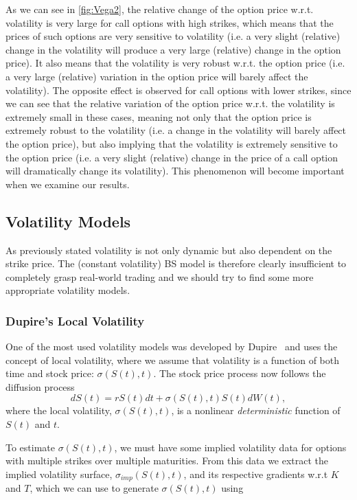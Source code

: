 As we can see in \autoref{fig:Vega2}, the relative change of the option price w.r.t. volatility is very large for call options with high strikes, which means that the prices of such options are very sensitive to volatility (i.e. a very slight (relative) change in the volatility will produce a very large (relative) change in the option price). It also means that the volatility is very robust w.r.t. the option price (i.e. a very large (relative) variation in the option price will barely affect the volatility).
The opposite effect is observed for call options with lower strikes, since we can see that the relative variation of the option price w.r.t. the volatility is extremely small in these cases, meaning not only that the option price is extremely robust to the volatility (i.e. a change in the volatility will barely affect the option price), but also implying that the volatility is extremely sensitive to the option price (i.e. a very slight (relative) change in the price of a call option will dramatically change its volatility).
This phenomenon will become important when we examine our results.

\subsection{Volatility Models}
As previously stated volatility is not only dynamic but also dependent on the strike price.
The (constant volatility) BS model is therefore clearly insufficient to completely grasp real-world trading and we should try to find some more appropriate volatility models.

\vspace{5pt}
\subsubsection{Dupire's Local Volatility}
One of the most used volatility models was developed by Dupire~\citep{Dupire} and uses the concept of local volatility, where we assume that volatility is a function of both time and stock price: $\sigma(S(t),t)$.
The stock price process now follows the diffusion process
\begin{equation}\label{GBM2}
dS(t)=rS(t)dt+\sigma(S(t),t)S(t)dW(t),
\end{equation}
\noindent where the local volatility, $\sigma(S(t),t)$, is a nonlinear \emph{deterministic} function of $S(t)$ and $t$.

To estimate $\sigma(S(t),t)$, we must have some implied volatility data for options with multiple strikes over multiple maturities. From this data we extract the implied volatility surface, $\sigma_{imp}(S(t),t)$, and its respective gradients w.r.t $K$ and $T$, which we can use to generate $\sigma(S(t),t)$ using


